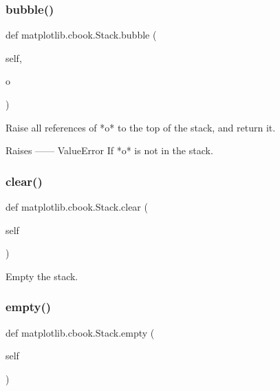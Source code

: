 \subsubsection{\texorpdfstring{bubble()}{bubble()}}
{\footnotesize\ttfamily def matplotlib.\+cbook.\+Stack.\+bubble (\begin{DoxyParamCaption}\item[{}]{self,  }\item[{}]{o }\end{DoxyParamCaption})}

\begin{DoxyVerb}Raise all references of *o* to the top of the stack, and return it.

Raises
------
ValueError
    If *o* is not in the stack.
\end{DoxyVerb}
 \mbox{\label{classmatplotlib_1_1cbook_1_1Stack_a718219942a9e9f4f822da9fa384da57e}} 
\subsubsection{\texorpdfstring{clear()}{clear()}}
{\footnotesize\ttfamily def matplotlib.\+cbook.\+Stack.\+clear (\begin{DoxyParamCaption}\item[{}]{self }\end{DoxyParamCaption})}

\begin{DoxyVerb}Empty the stack.\end{DoxyVerb}
 \mbox{\label{classmatplotlib_1_1cbook_1_1Stack_a39a20a8fe56fc76af8599cd239fa19ff}} 
\subsubsection{\texorpdfstring{empty()}{empty()}}
{\footnotesize\ttfamily def matplotlib.\+cbook.\+Stack.\+empty (\begin{DoxyParamCaption}\item[{}]{self }\end{DoxyParamCaption})}

